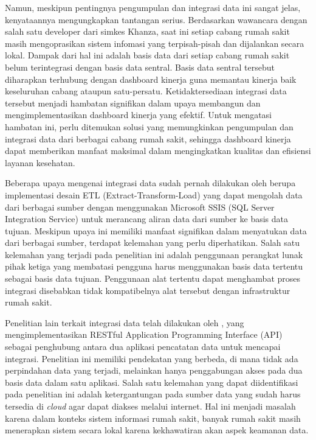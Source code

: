 Namun, meskipun pentingnya pengumpulan dan integrasi data ini sangat jelas, kenyataannya mengungkapkan tantangan serius. Berdasarkan wawancara dengan salah satu developer dari simkes Khanza, saat ini setiap cabang rumah sakit masih mengoprasikan sistem infomasi yang terpisah-pisah dan dijalankan secara lokal. Dampak dari hal ini adalah basis data dari setiap cabang rumah sakit belum terintegrasi dengan basis data sentral. Basis data sentral tersebut diharapkan terhubung dengan dashboard kinerja guna memantau kinerja baik keseluruhan cabang ataupun satu-persatu. Ketidaktersediaan integrasi data tersebut menjadi hambatan signifikan dalam upaya membangun dan mengimplementasikan dashboard kinerja yang efektif. Untuk mengatasi hambatan ini, perlu ditemukan solusi yang memungkinkan pengumpulan dan integrasi data dari berbagai cabang rumah sakit, sehingga dashboard kinerja dapat memberikan manfaat maksimal dalam mengingkatkan kualitas dan efisiensi layanan kesehatan.\parencite{Basile2023}

Beberapa upaya mengenai integrasi data sudah pernah dilakukan oleh \textcite{Firdaus2022MEMBANGUNID} berupa implementasi desain ETL (Extract-Transform-Load) yang dapat mengolah data dari berbagai sumber dengan menggunakan Microsoft SSIS (SQL Server Integration Service) untuk merancang aliran data dari sumber ke basis data tujuan. Meskipun upaya ini memiliki manfaat signifikan dalam menyatukan data dari berbagai sumber, terdapat kelemahan yang perlu diperhatikan. Salah satu kelemahan yang terjadi pada penelitian ini adalah penggunaan perangkat lunak pihak ketiga yang membatasi pengguna harus menggunakan basis data tertentu sebagai basis data tujuan. Penggunaan alat tertentu dapat menghambat proses integrasi disebabkan tidak kompatibelnya alat tersebut dengan infrastruktur rumah sakit.


Penelitian lain terkait integrasi data telah dilakukan oleh \textcite{Herfandi_Julkarnain_Hanif_2022}, yang mengimplementasikan RESTful Application Programming Interface (API) sebagai penghubung antara dua aplikasi pencatatan data untuk mencapai integrasi. Penelitian ini memiliki pendekatan yang berbeda, di mana tidak ada perpindahan data yang terjadi, melainkan hanya penggabungan akses pada dua basis data dalam satu aplikasi. Salah satu kelemahan yang dapat diidentifikasi pada penelitian ini adalah ketergantungan pada sumber data yang sudah harus tersedia di \emph{cloud} agar dapat diakses melalui internet. Hal ini menjadi masalah karena dalam konteks sistem informasi rumah sakit, banyak rumah sakit masih menerapkan sistem secara lokal karena kekhawatiran akan aspek keamanan data. 

